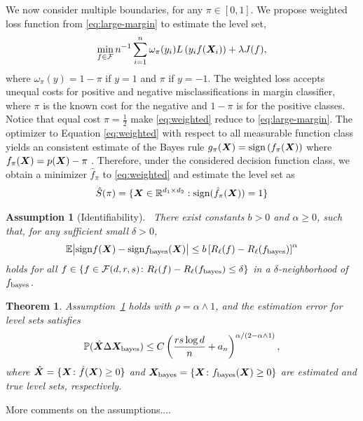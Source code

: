 \documentclass[mathptm]{statsoc}
\newtheorem{thm}{Theorem}[section]
\newtheorem{assumption}{Assumption}
\def\sign{\textup{sign}}
\def\bayesf{f_{\textup{bayes}}}
\begin{document}
We now consider multiple boundaries, for any $\pi\in[0,1]$. We propose weighted loss function from \eqref{eq:large-margin} to estimate the level set, 
\begin{align}
\label{eq:weighted}
\min_{f\in\mathcal{F}}n^{-1}\sum_{i=1}^n \omega_{\pi}(y_i)L\left(y_if(\bm X_i)\right)+ \lambda J(f),
\end{align}
where $\omega_\pi(y) = 1-\pi $ if $y = 1$ and $\pi$ if $y = -1$. The weighted loss accepts unequal costs for positive and negative misclassifications in margin classifier, where $\pi$ is the known cost for the negative and $1-\pi$ is for the positive classes. Notice that equal cost $\pi = \frac{1}{2}$ make \eqref{eq:weighted} reduce to \eqref{eq:large-margin}. 
The optimizer to Equation \eqref{eq:weighted} with respect to all measurable function class yields an consistent estimate of the Bayes rule $g_\pi(\bm X) = \text{sign}\left(f_\pi(\bm X)\right)$ where $f_\pi(\bm X) = p(\bm X) - \pi$ \citep{lin2002support,wang2008probability}. 
Therefore, under the considered decision function class, we obtain a minimizer $\hat f_\pi$ to \eqref{eq:weighted} and estimate the level set as
\begin{align}\label{eq:levelset}\hat S(\pi) = \{\bm X\in\mathbb{R}^{d_1\times d_2} : \text{sign}(\hat f_\pi(\bm X)) = 1\}
\end{align}

\begin{assumption}[Identifiability]~\label{ass:main}
There exist constants $b>0$ and $\alpha\geq 0$, such that, for any sufficient small $\delta>0$,
\[
\mathbb{E} \big|\sign  f (\mX)- \sign \bayesf(\mX)\big| \leq b\left[R_\ell(f)-R_\ell(\bayesf)\right]^\alpha
\]
holds for all $f\in \{ f\in\tF(d,r,s)\colon R_\ell(f)-R_\ell(\bayesf) \leq \delta\}$ in a $\delta$-neighborhood of $\bayesf$.
\end{assumption}

\begin{thm}
Assumption~\ref{ass:main} holds with $\rho=\alpha\wedge 1$, and the estimation error for level sets satisfies
\[
\mathbb{P}(\hat {\bm X}\Delta\bm X_{\text{bayes}}) \leq C\left({rs\log d \over n}+a_n\right)^{\alpha/(2-\alpha\wedge 1)},
\]
where $\hat {\bm X}=\{\bm X\colon \hat f(\bm X)\geq 0\}$ and $\mX_{\text{bayes}}=\{\mX\colon \bayesf(\mX)\geq 0\}$ are estimated and true level sets, respectively. 
\end{thm}

More comments on the assumptions....
\end{document}
